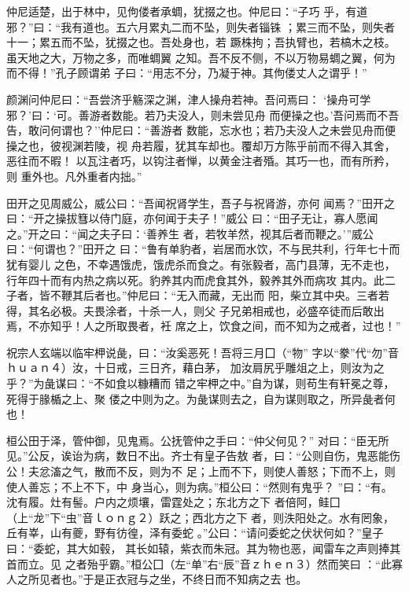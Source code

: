 \documentclass[]{article}
\begin{document}
仲尼适楚，出于林中，见佝偻者承蜩，犹掇之也。仲尼曰：``子巧
乎，有道邪？''曰：``我有道也。五六月累丸二而不坠，则失者锱铢
；累三而不坠，则失者十一；累五而不坠，犹掇之也。吾处身也，若
蹶株拘；吾执臂也，若槁木之枝。虽天地之大，万物之多，而唯蜩翼
之知。吾不反不侧，不以万物易蜩之翼，何为而不得！''孔子顾谓弟
子曰：``用志不分，乃凝于神。其佝偻丈人之谓乎！''

颜渊问仲尼曰：``吾尝济乎觞深之渊，津人操舟若神。吾问焉曰：
`操舟可学邪？'曰：`可。善游者数能。若乃夫没人，则未尝见舟
而便操之也。'吾问焉而不吾告，敢问何谓也？''仲尼曰：``善游者
数能，忘水也；若乃夫没人之未尝见舟而便操之也，彼视渊若陵，视
舟若履，犹其车却也。覆却万方陈乎前而不得入其舍，恶往而不暇！
以瓦注者巧，以钩注者惮，以黄金注者殙。其巧一也，而有所矜，则
重外也。凡外重者内拙。''

田开之见周威公，威公曰：``吾闻祝肾学生，吾子与祝肾游，亦何
闻焉？''田开之曰：``开之操拔篲以侍门庭，亦何闻于夫子！''威公
曰：``田子无让，寡人愿闻之。''开之曰：``闻之夫子曰：`善养生
者，若牧羊然，视其后者而鞭之。'''威公曰：``何谓也？''田开之
曰：``鲁有单豹者，岩居而水饮，不与民共利，行年七十而犹有婴儿
之色，不幸遇饿虎，饿虎杀而食之。有张毅者，高门县薄，无不走也，
行年四十而有内热之病以死。豹养其内而虎食其外，毅养其外而病攻
其内。此二子者，皆不鞭其后者也。''仲尼曰：``无入而藏，无出而
阳，柴立其中央。三者若得，其名必极。夫畏涂者，十杀一人，则父
子兄弟相戒也，必盛卒徒而后敢出焉，不亦知乎！人之所取畏者，衽
席之上，饮食之间，而不知为之戒者，过也！''

祝宗人玄端以临牢柙说彘，曰：``汝奚恶死！吾将三月囗（``物''
字以``豢''代``勿''音ｈｕａｎ４）汝，十日戒，三日齐，藉白茅，
加汝肩尻乎雕俎之上，则汝为之乎？''为彘谋曰：``不如食以糠糟而
错之牢柙之中。''自为谋，则苟生有轩冕之尊，死得于腞楯之上、聚
偻之中则为之。为彘谋则去之，自为谋则取之，所异彘者何也！

桓公田于泽，管仲御，见鬼焉。公抚管仲之手曰：``仲父何见？''
对曰：``臣无所见。''公反，诶诒为病，数日不出。齐士有皇子告敖
者，曰：``公则自伤，鬼恶能伤公！夫忿滀之气，散而不反，则为不
足；上而不下，则使人善怒；下而不上，则使人善忘；不上不下，中
身当心，则为病。''桓公曰：``然则有鬼乎？
''曰：``有。沈有履。灶有髻。户内之烦壤，雷霆处之；东北方之下
者倍阿，鲑囗（上``龙''下``虫''音ｌｏｎｇ２）跃之；西北方之下
者，则泆阳处之。水有罔象，丘有峷，山有夔，野有彷徨，泽有委蛇
。''公曰：``请问委蛇之伏状何如？''皇子曰：``委蛇，其大如毂，
其长如辕，紫衣而朱冠。其为物也恶，闻雷车之声则捧其首而立。见
之者殆乎霸。''桓公囗（左``单''右``辰''音ｚｈｅｎ３）然而笑曰
：``此寡人之所见者也。''于是正衣冠与之坐，不终日而不知病之去 也。
\end{document}
